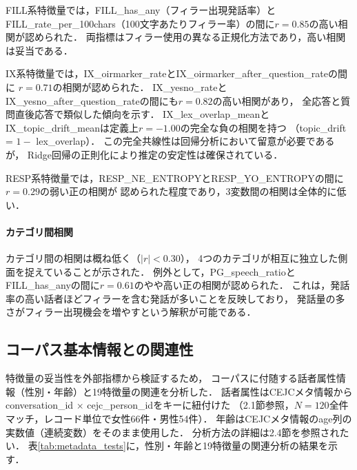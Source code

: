 \documentclass[dvipdfmx,11pt,a4paper]{bxjsarticle}
\begin{document}
FILL系特徴量では，FILL\_has\_any（フィラー出現発話率）と
FILL\_rate\_per\_100chars（100文字あたりフィラー率）の間に$r = 0.85$の高い相関が認められた．
両指標はフィラー使用の異なる正規化方法であり，高い相関は妥当である．

IX系特徴量では，IX\_oirmarker\_rateとIX\_oirmarker\_after\_question\_rateの間に
$r = 0.71$の相関が認められた．
IX\_yesno\_rateとIX\_yesno\_after\_question\_rateの間にも$r = 0.82$の高い相関があり，
全応答と質問直後応答で類似した傾向を示す．
IX\_lex\_overlap\_meanとIX\_topic\_drift\_meanは定義上$r = -1.00$の完全な負の相関を持つ
（topic\_drift = $1 -$ lex\_overlap）．
この完全共線性は回帰分析において留意が必要であるが，
Ridge回帰の正則化により推定の安定性は確保されている．

RESP系特徴量では，RESP\_NE\_ENTROPYとRESP\_YO\_ENTROPYの間に$r = 0.29$の弱い正の相関が
認められた程度であり，3変数間の相関は全体的に低い．

\paragraph{カテゴリ間相関}
カテゴリ間の相関は概ね低く（$|r| < 0.30$），
4つのカテゴリが相互に独立した側面を捉えていることが示された．
例外として，PG\_speech\_ratioとFILL\_has\_anyの間に$r = 0.61$のやや高い正の相関が認められた．
これは，発話率の高い話者ほどフィラーを含む発話が多いことを反映しており，
発話量の多さがフィラー出現機会を増やすという解釈が可能である．

\subsection{コーパス基本情報との関連性}
\label{sec:result_metadata}

特徴量の妥当性を外部指標から検証するため，
コーパスに付随する話者属性情報（性別・年齢）と19特徴量の関連を分析した．
話者属性はCEJCメタ情報から
conversation\_id $\times$ cejc\_person\_idをキーに紐付けた
（2.1節参照，$N = 120$全件マッチ，レコード単位で女性66件・男性54件）．
年齢はCEJCメタ情報のage列の実数値（連続変数）をそのまま使用した．
分析方法の詳細は2.4節を参照されたい．
表\ref{tab:metadata_tests}に，性別・年齢と19特徴量の関連分析の結果を示す．

\begin{table}[htbp]
\centering
\caption{19特徴量とコーパス基本情報（性別・年齢）の関連分析．
太字は$p < 0.05$を示す．年齢との関連はSpearman順位相関係数$\rho$で報告する
（Pearson $r$でも同様の有意/非有意パターンが得られた）．
分析方法の詳細は2.4節を参照．}
\label{tab:metadata_tests}

\end{table}
\end{document}
